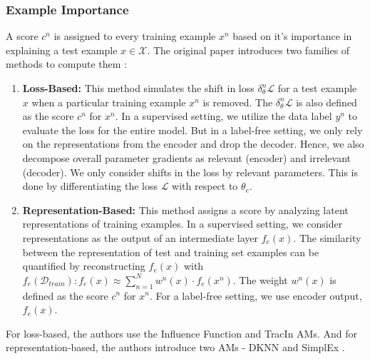 \subsubsection{Example Importance} \label{ex_theory} A score $c^n$ is assigned to every training example $x^n$ based on it's importance in explaining a test example $x \in \mathcal{X}$. The original paper introduces two families of methods to compute them \citep{mainpaper}:
\begin{enumerate}
\itemsep0em
    \item \textbf{Loss-Based:} This method simulates the shift in loss $\delta^n_{\theta}\mathcal{L}$ for a test example $x$ when a particular training example $x^n$ is removed. The $\delta^n_{\theta}\mathcal{L}$ is also defined as the score $c^n$ for $x^n$. In a supervised setting, we utilize the data label $y^n$ to evaluate the loss for the entire model. But in a label-free setting, we only rely on the representations from the encoder and drop the decoder. Hence, we also decompose overall parameter gradients as relevant (encoder) and irrelevant (decoder). We only consider shifts in the loss by relevant parameters. This is done by differentiating the loss $\mathcal{L}$ with respect to $\theta_e$.
    \item \textbf{Representation-Based:} This method assigns a score by analyzing latent representations of training examples. In a supervised setting, we consider representations as the output of an intermediate layer $f_e(x)$. The similarity between the representation of test and training set examples can be quantified by reconstructing $f_e(x)$ with $f_e(\mathcal{D}_{train}): f_e(x) \approx \sum_{n=1}^N w^n(x) \cdot f_e(x^n)$. The weight $w^n(x)$ is defined as the score $c^n$ for $x^n$. For a label-free setting, we use encoder output, $f_e(x)$.
\end{enumerate}

For loss-based, the authors use the Influence Function \citep{Koh} and TracIn \citep{Pruthi} AMs. And for representation-based, the authors introduce two AMs - DKNN and SimplEx \citep{mainpaper}.


